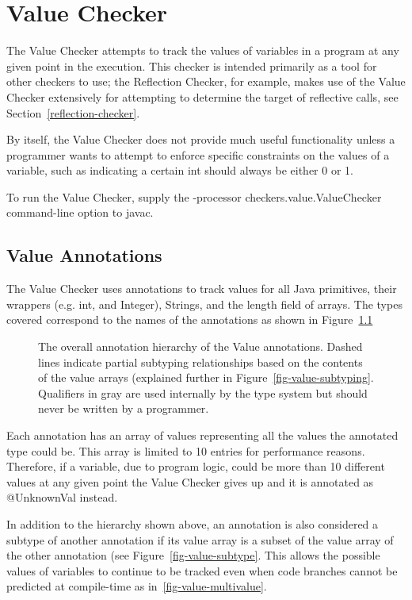 \htmlhr
\chapter{Value Checker\label{value-checker}}

The Value Checker attempts to track the values of variables in a
program at any given point in the execution. This checker is intended
primarily as a tool for other checkers to use; the Reflection Checker,
for example, makes use of the Value Checker extensively for attempting
to determine the target of reflective calls, see
Section~\ref{reflection-checker}.

By itself, the Value Checker does not provide much useful
functionality unless a programmer wants to attempt to enforce specific
constraints on the values of a variable, such as indicating a certain
int should always be either 0 or 1.

To run the Value Checker, supply the -processor
checkers.value.ValueChecker command-line option to javac.

\section{Value Annotations}

The Value Checker uses annotations to track values for all Java
primitives, their wrappers (e.g. int, and Integer), Strings, and the
length field of arrays. The types covered correspond to the names of
the annotations as shown in Figure~\ref{fig-value-hierarchy}

\begin{figure}
\caption{The overall annotation hierarchy of the Value
annotations. Dashed lines indicate partial subtyping relationships
based on the contents of the value arrays (explained further in
Figure~\ref{fig-value-subtyping}. Qualifiers in gray are used
internally by the type system but should never be written by a
programmer.}
\label{fig-value-hierarchy}
\end{figure}

Each annotation has an array of values representing all the values the
annotated type could be. This array is limited to 10 entries for
performance reasons. Therefore, if a variable, due to program logic,
could be more than 10 different values at any given point the Value
Checker gives up and it is annotated as @UnknownVal instead.

In addition to the hierarchy shown above, an annotation is also
considered a subtype of another annotation if its value array is a
subset of the value array of the other annotation (see
Figure~\ref{fig-value-subtype}. This allows the possible values of
variables to continue to be tracked even when code branches cannot be
predicted at compile-time as in~\ref{fig-value-multivalue}.

